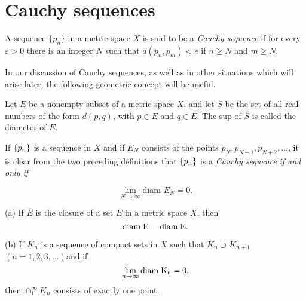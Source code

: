 \section{Cauchy sequences}
\begin{mydef}\label{mydef:3.8}
    A sequence $\{p_n\}$ in a metric space $X$ is said to be a \emph{Cauchy sequence} if for every $\varepsilon > 0$ there is an integer $N$ such that $d(p_n, p_m) <e$ if $n \geq N$ and $m \geq N$. 
\end{mydef}

In our discussion of Cauchy sequences, as well as in other situations
which will arise later, the following geometric concept will be useful.

\begin{mydef}\label{mydef:3.9}
    Let $E$ be a nonempty subset of a metric space $X$, and let $S$ be the set of all real numbers of the form $d(p, q)$, with $p \in E$ and $q \in E$. The sup of $S$ is called the diameter of $E$.    
\end{mydef}

If $\protect\{p_n\}$ is a sequence in $X$ and if $E_N$ consists of the points $p_N, p_{N+1}, p_{N+2},\dots$, it is clear from the two preceding definitions that $\protect\{p_n\}$ is a \emph{Cauchy sequence} \emph{if and only if}

\begin{equation*}
    \lim_{N \to \infty} \text{diam } E_N = 0.
\end{equation*}

\begin{thm}\label{thm:3.10}
    (a) If $\overline{E}$ is the closure of a set $E$ in a metric space $X$, then 
    \begin{equation*}
        \rm{diam }\; E = \rm{diam }\; E.
    \end{equation*}
    
    (b) If $K_n$ is a sequence of compact sets in $X$ such that $K_n \supset K_{n+1} $ $(n=1,2,3,...) $and if
    \begin{equation*}
        \lim_{n \to \infty} \rm {diam }\; K_n = 0,
    \end{equation*}
    then $\cap_1^\infty K_n$ consists of exactly one point.
\end{thm}


